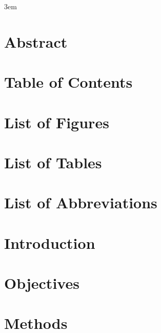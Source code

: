 \documentclass[10pt,twoside]{book}
\begin{document}
\emergencystretch 3em

\frontmatter




\chapter{Abstract}

\clearpage

\chapter{Table of Contents}
\tableofcontents %
\clearpage

\chapter{List of Figures}
\listoffigures
\clearpage

\chapter{List of Tables}
\listoftables
\clearpage

\chapter{List of Abbreviations}

\clearpage

\mainmatter

\chapter{Introduction}
\clearpage


\clearpage

\chapter{Objectives}
\clearpage


\clearpage

\chapter{Methods}
\clearpage

\clearpage
\end{document}
